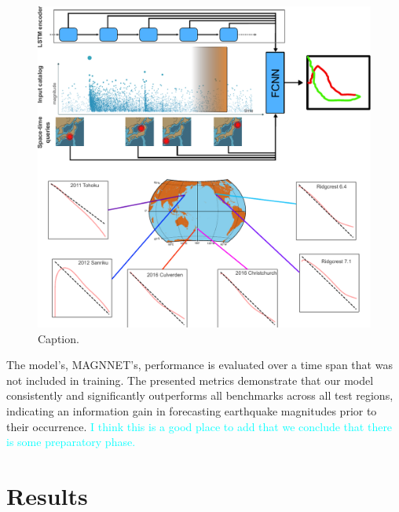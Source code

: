 \documentclass[pdflatex]{sn-jnl}
\newcommand{\neri}[1]{{\textcolor{cyan}{#1}}}
\begin{document}
\begin{figure}[h!]
	\centering
        \includegraphics[width=1\textwidth]{figures/intro_fig.pdf}
	\caption{
 Caption.
}
\label{fig:intro_fig}
\end{figure}


The model's, MAGNNET's, performance is evaluated over a time span that was not included in training. The presented metrics demonstrate that our model consistently and significantly outperforms all benchmarks across all test regions, indicating an information gain in forecasting earthquake magnitudes prior to their occurrence. \neri{I think this is a good place to add that we conclude that there is some preparatory phase.}



\section{Results} \label{sec:results}
\end{document}
